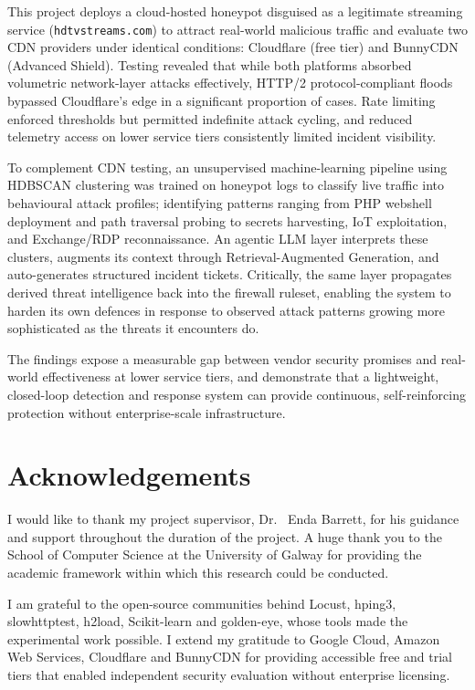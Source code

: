 \documentclass[12pt, a4paper]{report}   %
\begin{document}
This project deploys a cloud-hosted honeypot disguised as a legitimate streaming
service (\texttt{hdtvstreams.com}) to attract real-world malicious traffic and
evaluate two CDN providers under identical conditions: Cloudflare (free tier)
and BunnyCDN (Advanced Shield). Testing revealed that while both platforms
absorbed volumetric network-layer attacks effectively, HTTP/2
protocol-compliant floods bypassed Cloudflare's edge in a significant proportion
of cases. Rate limiting enforced thresholds but permitted indefinite attack
cycling, and reduced telemetry access on lower service tiers consistently
limited incident visibility.

To complement CDN testing, an unsupervised machine-learning pipeline using
HDBSCAN clustering was trained on honeypot logs to classify live traffic into
behavioural attack profiles; identifying patterns ranging from PHP webshell
deployment and path traversal probing to secrets harvesting, IoT exploitation,
and Exchange/RDP reconnaissance. An agentic LLM layer interprets these clusters,
augments its context through Retrieval-Augmented Generation, and auto-generates
structured incident tickets. Critically, the same layer propagates derived
threat intelligence back into the firewall ruleset, enabling the system to
harden its own defences in response to observed attack patterns growing more
sophisticated as the threats it encounters do.

The findings expose a measurable gap between vendor security promises and
real-world effectiveness at lower service tiers, and demonstrate that a
lightweight, closed-loop detection and response system can provide continuous,
self-reinforcing protection without enterprise-scale infrastructure.


\chapter*{Acknowledgements}

I would like to thank my project supervisor, Dr. \ Enda Barrett, for his guidance and support throughout
the duration of the project. A huge thank you to the School of Computer Science at
the University of Galway for providing the academic framework within which this
research could be conducted.

I am grateful to the open-source communities behind Locust, hping3, slowhttptest,
h2load, Scikit-learn and golden-eye, whose tools made the experimental work possible.
I extend my gratitude to Google Cloud, Amazon Web Services, Cloudflare and BunnyCDN
for providing accessible free and trial tiers that enabled independent security
evaluation without enterprise licensing.
\end{document}
